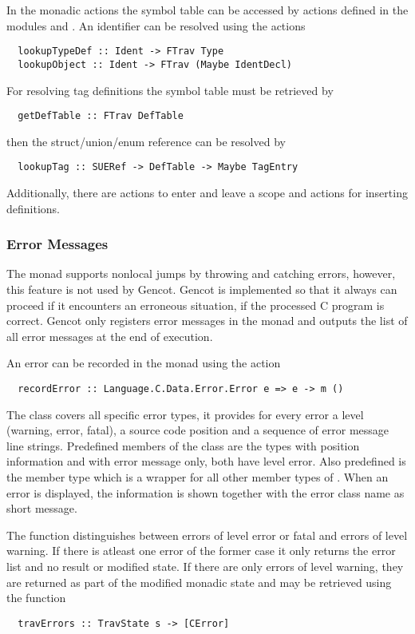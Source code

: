 In the monadic actions the symbol table can be accessed by actions defined in the modules
 and . An identifier can be
resolved using the actions
\begin{verbatim}
  lookupTypeDef :: Ident -> FTrav Type
  lookupObject :: Ident -> FTrav (Maybe IdentDecl)
\end{verbatim}
For resolving tag definitions the symbol table must be retrieved by
\begin{verbatim}
  getDefTable :: FTrav DefTable
\end{verbatim}
then the struct/union/enum reference can be resolved by
\begin{verbatim}
  lookupTag :: SUERef -> DefTable -> Maybe TagEntry
\end{verbatim}
Additionally, there are actions to enter and leave a scope and actions for inserting definitions.

\subsubsection{Error Messages}

The monad supports nonlocal jumps by throwing and catching errors, however, this feature is not used by Gencot.
Gencot is implemented so that it always can proceed if it encounters an erroneous situation, if the processed
C program is correct. Gencot only registers error messages in the monad and outputs the list of all error messages
at the end of execution.

An error can be recorded in the monad using the action
\begin{verbatim}
  recordError :: Language.C.Data.Error.Error e => e -> m ()
\end{verbatim}
The class  covers all specific error types, it provides for every error a level (warning, error, fatal),
a source code position and a sequence of error message line strings. Predefined members of the class are the types
 with position information and  with error message only, both have level error.
Also predefined is the member type  which is a wrapper for all other member types of . When
an error is displayed, the information is shown together with the error class name as short message.

The function  distinguishes between errors of level error or fatal and errors of level warning. If there
is atleast one error of the former case it only returns the error list and no result or modified state. If there are
only errors of level warning, they are returned as part of the modified monadic state and may be retrieved using the
function
\begin{verbatim}
  travErrors :: TravState s -> [CError]
\end{verbatim}

